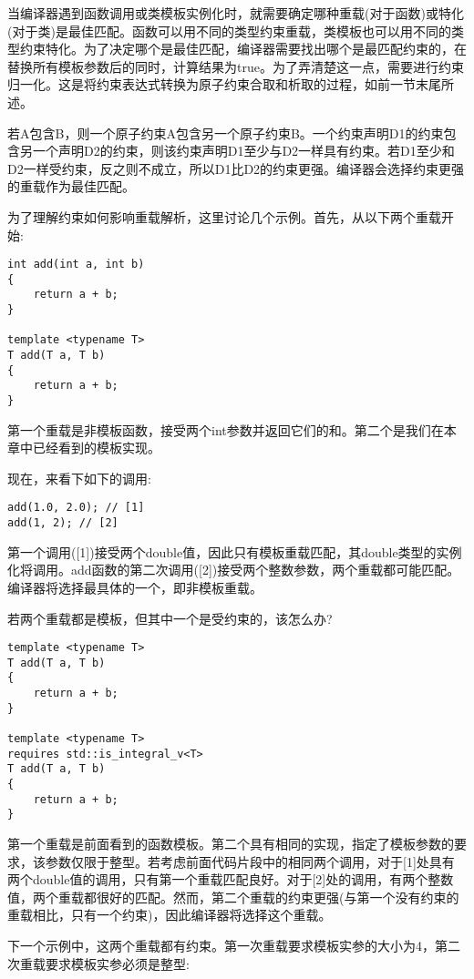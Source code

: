 当编译器遇到函数调用或类模板实例化时，就需要确定哪种重载(对于函数)或特化(对于类)是最佳匹配。函数可以用不同的类型约束重载，类模板也可以用不同的类型约束特化。为了决定哪个是最佳匹配，编译器需要找出哪个是最匹配约束的，在替换所有模板参数后的同时，计算结果为true。为了弄清楚这一点，需要进行约束归一化。这是将约束表达式转换为原子约束合取和析取的过程，如前一节末尾所述。

若A包含B，则一个原子约束A包含另一个原子约束B。一个约束声明D1的约束包含另一个声明D2的约束，则该约束声明D1至少与D2一样具有约束。若D1至少和D2一样受约束，反之则不成立，所以D1比D2的约束更强。编译器会选择约束更强的重载作为最佳匹配。

为了理解约束如何影响重载解析，这里讨论几个示例。首先，从以下两个重载开始:

\begin{lstlisting}[style=styleCXX]
int add(int a, int b)
{
	return a + b;
}

template <typename T>
T add(T a, T b)
{
	return a + b;
}
\end{lstlisting}

第一个重载是非模板函数，接受两个int参数并返回它们的和。第二个是我们在本章中已经看到的模板实现。

现在，来看下如下的调用:

\begin{lstlisting}[style=styleCXX]
add(1.0, 2.0); // [1]
add(1, 2); // [2]
\end{lstlisting}

第一个调用([1])接受两个double值，因此只有模板重载匹配，其double类型的实例化将调用。add函数的第二次调用([2])接受两个整数参数，两个重载都可能匹配。编译器将选择最具体的一个，即非模板重载。

若两个重载都是模板，但其中一个是受约束的，该怎么办?

\begin{lstlisting}[style=styleCXX]
template <typename T>
T add(T a, T b)
{
	return a + b;
}

template <typename T>
requires std::is_integral_v<T>
T add(T a, T b)
{
	return a + b;
}
\end{lstlisting}

第一个重载是前面看到的函数模板。第二个具有相同的实现，指定了模板参数的要求，该参数仅限于整型。若考虑前面代码片段中的相同两个调用，对于[1]处具有两个double值的调用，只有第一个重载匹配良好。对于[2]处的调用，有两个整数值，两个重载都很好的匹配。然而，第二个重载的约束更强(与第一个没有约束的重载相比，只有一个约束)，因此编译器将选择这个重载。

下一个示例中，这两个重载都有约束。第一次重载要求模板实参的大小为4，第二次重载要求模板实参必须是整型:

